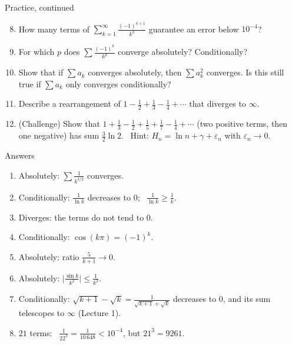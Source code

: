 \documentclass{wosm-slides}
\begin{document}
\begin{frame}{Practice, continued}
  \small
  \begin{enumerate}
    \setcounter{enumi}{7}
    \item How many terms of $\sum_{k=1}^\infty \frac{(-1)^{k+1}}{k^3}$ guarantee an error
      below $10^{-4}$?
    \item For which $p$ does $\sum \frac{(-1)^k}{k^p}$ converge absolutely? Conditionally?
    \item Show that if $\sum a_k$ converges absolutely, then $\sum a_k^2$ converges.
      Is this still true if $\sum a_k$ only converges conditionally?
    \item Describe a rearrangement of $1 - \frac12 + \frac13 - \frac14 + \cdots$ that
      diverges to $\infty$.
    \item (Challenge) Show that $1 + \frac13 - \frac12 + \frac15 + \frac17 - \frac14 + \cdots$
      (two positive terms, then one negative) has sum $\frac32 \ln 2$. \
      Hint: $H_n = \ln n + \gamma + \varepsilon_n$ with $\varepsilon_n \to 0$.
  \end{enumerate}
\end{frame}

\begin{frame}{Answers}
  \small
  \begin{enumerate}
    \item Absolutely: $\sum \frac{1}{k^{3/2}}$ converges.
    \item Conditionally: $\frac{1}{\ln k}$ decreases to $0$; \ $\frac{1}{\ln k} \ge \frac1k$.
    \item Diverges: the terms do not tend to $0$.
    \item Conditionally: $\cos(k\pi) = (-1)^k$.
    \item Absolutely: ratio $\frac{5}{k+1} \to 0$.
    \item Absolutely: $\bigl|\frac{\sin k}{k^3}\bigr| \le \frac{1}{k^3}$.
    \item Conditionally: $\sqrt{k+1} - \sqrt{k} = \frac{1}{\sqrt{k+1} + \sqrt{k}}$ decreases
      to $0$, and its sum telescopes to $\infty$ (Lecture 1).
    \item $21$ terms: \ $\frac{1}{22^3} = \frac{1}{10\,648} < 10^{-4}$, but $21^3 = 9261$.
  \end{enumerate}
\end{frame}
\end{document}
